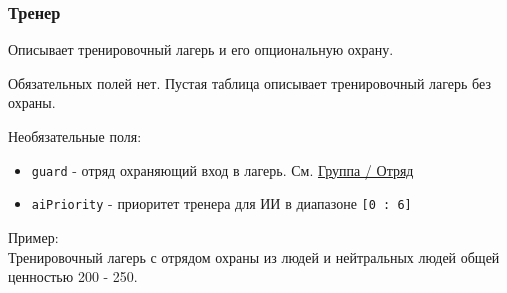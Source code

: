 \subsubsection{Тренер}
\label{trainer}
Описывает тренировочный лагерь и его опциональную охрану.

Обязательных полей нет. Пустая таблица описывает тренировочный лагерь без охраны.

Необязательные поля:
\begin{itemize}
\item \texttt{guard} - отряд охраняющий вход в лагерь. См. \hyperref[group]{Группа / Отряд}
\item \texttt{aiPriority} - приоритет тренера для ИИ в диапазоне \texttt{[0 : 6]}
\end{itemize}

Пример:\\
Тренировочный лагерь с отрядом охраны из людей и нейтральных людей общей ценностью 200 - 250.

\begin{figure}[H]

\end{figure}